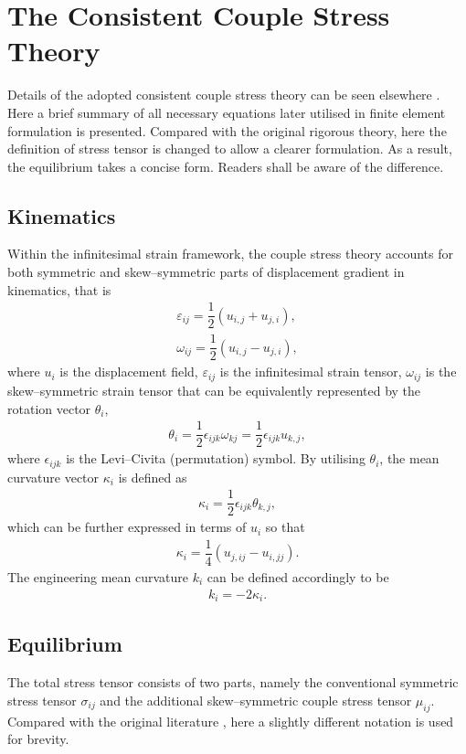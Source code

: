 \documentclass[3p,sort&compress,11pt,fleqn,review]{elsarticle}
\begin{document}
\section{The Consistent Couple Stress Theory}
Details of the adopted consistent couple stress theory can be seen elsewhere \citep{Hadjesfandiari2011}. Here a brief summary of all necessary equations later utilised in finite element formulation is presented. \alert{Compared with the original rigorous theory, here the definition of stress tensor is changed to allow a clearer formulation. As a result, the equilibrium takes a concise form. Readers shall be aware of the difference.}
\subsection{Kinematics}
Within the infinitesimal strain framework, the couple stress theory \citep{Hadjesfandiari2011} accounts for both symmetric and skew--symmetric parts of displacement gradient in kinematics, that is
\begin{gather}\label{eq:varepsilon}
\varepsilon_{ij}=\dfrac{1}{2}\left(u_{i,j}+u_{j,i}\right),\\
\omega_{ij}=\dfrac{1}{2}\left(u_{i,j}-u_{j,i}\right),
\end{gather}
where $u_i$ is the displacement field, $\varepsilon_{ij}$ is the infinitesimal strain tensor, $\omega_{ij}$ is the skew--symmetric strain tensor that can be equivalently represented by the rotation vector $\theta_i$,
\begin{gather}\label{eq:theta}
\theta_i=\dfrac{1}{2}\epsilon_{ijk}\omega_{kj}=\dfrac{1}{2}\epsilon_{ijk}u_{k,j},
\end{gather}
where $\epsilon_{ijk}$ is the Levi--Civita (permutation) symbol. By utilising $\theta_i$, the mean curvature vector $\kappa_i$ is defined as
\begin{gather}\label{eq:kappa}
\kappa_i=\dfrac{1}{2}\epsilon_{ijk}\theta_{k,j},
\end{gather}
which can be further expressed in terms of $u_i$ so that
\begin{gather}
\kappa_i=\dfrac{1}{4}\left(u_{j,ij}-u_{i,jj}\right).
\end{gather}
The engineering mean curvature $k_i$ can be defined accordingly to be
\begin{gather}
k_i=-2\kappa_i.
\end{gather}
\subsection{Equilibrium}
The total stress tensor consists of two parts, namely the conventional symmetric stress tensor $\sigma_{ij}$ and the additional skew--symmetric couple stress tensor $\mu_{ij}$. Compared with the original literature \citep{Hadjesfandiari2011}, here a slightly different notation is used for brevity.
\end{document}
